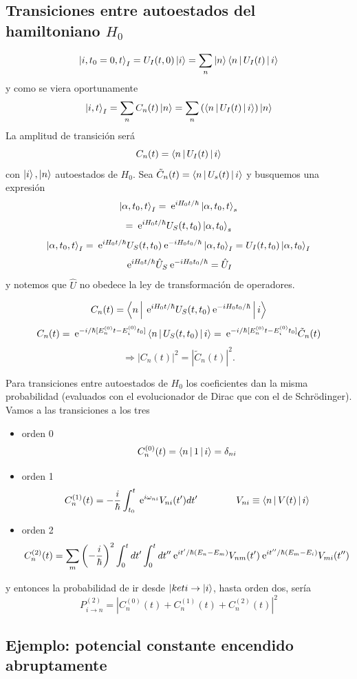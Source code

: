 \documentclass[10pt,oneside]{CBFT_book}
\begin{document}
\subsection{Transiciones entre autoestados del hamiltoniano $H_0$}
\[
	\Ket{i,t_0=0,t}_I = U_I(t,0) \Ket{i} = \sum_n \Ket{n}\Braket{n|U_I(t)|i}
\]
y como se viera oportunamente
\[
	\Ket{i,t}_I = \sum_n C_n(t)\Ket{n} = \sum_n \left( \Braket{n|U_I(t)|i} \right) \Ket{n}
\]
La amplitud de transición será 
\[
	C_n(t) = \Braket{n|U_I(t)|i}
\]
con $\Ket{i},\Ket{n}$ autoestados de $H_0$.
Sea $\tilde{C}_n(t)=\Braket{n|U_s(t)|i}$ y busquemos una expresión 
\[
	\Ket{\alpha, t_0, t}_I = \:\mathrm{e}^{iH_0t/\hbar} \Ket{\alpha, t_0, t}_s
\]
\[ 
	= \:\mathrm{e}^{iH_0t/\hbar} U_S(t,t_0)\Ket{\alpha, t_0}_s
\]
\[
	\Ket{\alpha, t_0, t}_I  = \:\mathrm{e}^{iH_0t/\hbar} U_S(t,t_0) \:\mathrm{e}^{-iH_0t_0/\hbar}  \Ket{\alpha, t_0}_I
	= U_I(t,t_0) \Ket{\alpha,t_0}_I
\]
\[
	\:\mathrm{e}^{iH_0t/\hbar} \hat{U}_S \:\mathrm{e}^{-iH_0t_0/\hbar} = \hat{U}_I
\]
y notemos que $\hat{U}$ no obedece la ley de transformación de operadores.

\[
	C_n(t) = \Braket{n|\:\mathrm{e}^{iH_0t/\hbar} U_S(t,t_0) \:\mathrm{e}^{-iH_0t_0/\hbar}|i}
\]
\[
	C_n(t) = \:\mathrm{e}^{-i/\hbar[E_n^{(0)} t - E_i^{(0)} t_0]} \Braket{n| U_S(t,t_0) |i} =
		\:\mathrm{e}^{-i/\hbar[E_n^{(0)} t - E_i^{(0)} t_0]} \tilde{C}_n(t)
\]
\[
	\Rightarrow |C_n(t)|^2 = |\tilde{C}_n(t)|^2.
\]

Para transiciones entre autoestados de $H_0$ los coeficientes dan la misma probabilidad (evaluados con el 
evolucionador de Dirac que con el de Schrödinger).
Vamos a las transiciones a los tres 
\begin{itemize}
 \item orden 0
 \[
	C_n^{(0)}(t) = \Braket{n|1|i} = \delta_{ni}
 \]
 \item orden 1
 \[
 	C_n^{(1)}(t) = -\frac{i}{\hbar} \int_{t_0}^t \:\mathrm{e}^{i\omega_{ni}} V_{ni}(t') dt' \qquad \qquad 
 	V_{ni} \equiv \Braket{n|V(t)|i}
 \]
 \item orden 2
 \[
 	C_n^{(2)}(t) = \sum_m \left( -\frac{i}{\hbar} \right)^2  \int_{0}^t  dt'\int_{0}^t dt''
 	\:\mathrm{e}^{it'/\hbar(E_n-E_m)} V_{nm}(t') \:\mathrm{e}^{it''/\hbar(E_m-E_i)} V_{mi}(t'')
 \]
\end{itemize}
y entonces la probabilidad de ir desde $|ket{i}\to \Ket{i}$, hasta orden dos, sería
\[
	P^{(2)}_{i\to n} = |C_n^{(0)}(t)+C_n^{(1)}(t)+C_n^{(2)}(t)|^2
\]

\subsection{Ejemplo: potencial constante encendido abruptamente}
\end{document}
